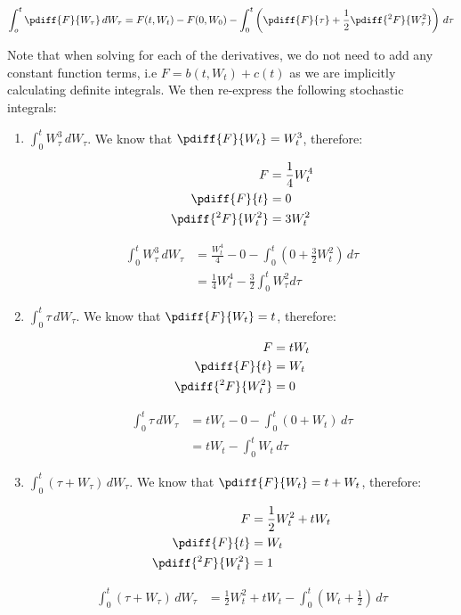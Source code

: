 \documentclass{article}
\begin{document}
	\begin{equation*}
		\int_o^t \pdiff{F}{W_\tau} \, dW_\tau = F(t, W_t) - F(0,W_0) - \int_0^t \left(\pdiff{F}{\tau} + \frac{1}{2}\pdiff{^2F}{W_\tau^2}\right) \, d\tau
	\end{equation*}
	
	Note that when solving for each of the derivatives, we do not need to add any constant function terms, i.e $F = b(t,W_t) + c(t)$ as we are implicitly calculating definite  integrals. We then re-express the following stochastic integrals:
	
	\begin{enumerate}[label*=\alph*.]
		\item $\int_0^t W_\tau^3 \, dW_\tau$. We know that $\pdiff{F}{W_t} = W_t^3$, therefore:
		
		\begin{align*}
			F &= \frac{1}{4}W_t^4 \\
			\pdiff{F}{t} &= 0 \\
			\pdiff{^2F}{W_t^2} &= 3W_t^2
		\end{align*}
		
		\begin{align*}
			\int_0^t W_\tau^3 \, dW_\tau &= \frac{W_t^4}{4} - 0 - \int_0^t \left(0 + \frac{3}{2}W_t^2\right) \, d\tau \\
			&= \frac{1}{4}W_t^4 - \frac{3}{2}\int_0^t W_\tau^2 d\tau
		\end{align*}
		
		\item $\int_0^t \tau  \, dW_\tau$. We know that $\pdiff{F}{W_t} = t$, therefore:
		
		\begin{align*}
			F &= tW_t \\
			\pdiff{F}{t} &= W_t \\
			\pdiff{^2F}{W_t^2} &= 0
		\end{align*}
		
		\begin{align*}
			\int_0^t \tau  \, dW_\tau &= tW_t - 0 - \int_0^t \left(0 + W_t\right) \, d\tau \\
			&= tW_t - \int_0^t W_t \, d\tau
		\end{align*}
		
		\item $\int_0^t (\tau + W_\tau)  \, dW_\tau$. We know that $\pdiff{F}{W_t} = t + W_t$, therefore:
		
		\begin{align*}
			F &= \frac{1}{2}W_t^2 + tW_t   \\
			\pdiff{F}{t} &= W_t \\
			\pdiff{^2F}{W_t^2} &= 1
		\end{align*}
		
		\begin{align*}
			\int_0^t (\tau + W_\tau)  \, dW_\tau &= \frac{1}{2}W_t^2 + tW_t - \int_0^t \left(W_t + \frac{1}{2}\right) \, d\tau
		\end{align*}
	\end{enumerate}
	
\end{document}
